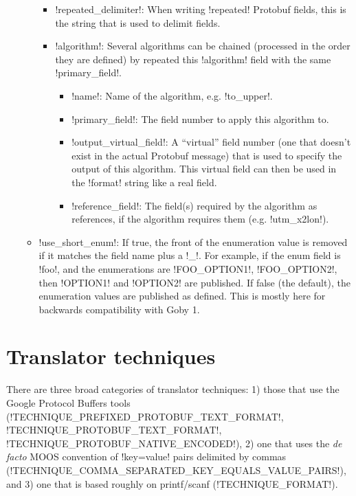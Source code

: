 \begin{itemize}
\begin{itemize}
\begin{itemize}
\item !repeated_delimiter!: When writing !repeated! Protobuf fields, this is the string that is used to delimit fields. 
\item !algorithm!: Several algorithms can be chained (processed in the order they are defined) by repeated this !algorithm! field with the same !primary_field!.
\begin{itemize}
\item !name!: Name of the algorithm, e.g. !to_upper!.
\item !primary_field!: The field number to apply this algorithm to. 
\item !output_virtual_field!: A ``virtual'' field number (one that doesn't exist in the actual Protobuf message) that is used to specify the output of this algorithm. This virtual field can then be used in the !format! string like a real field. 
\item !reference_field!: The field(s) required by the algorithm as references, if the algorithm requires them (e.g. !utm_x2lon!).
\end{itemize}
\end{itemize}
\item !use_short_enum!: If true, the front of the enumeration value is removed if it matches the field name plus a !_!. For example, if the enum field is !foo!, and the enumerations are !FOO_OPTION1!, !FOO_OPTION2!, then !OPTION1! and !OPTION2! are published. If false (the default), the enumeration values are published as defined. This is mostly here for backwards compatibility with Goby 1.
\end{itemize}
\end{itemize}


\section{Translator techniques}
\label{sec:ptranslator_techniques} 

There are three broad categories of translator techniques: 1) those that use the Google Protocol Buffers tools (!TECHNIQUE_PREFIXED_PROTOBUF_TEXT_FORMAT!, \\ !TECHNIQUE_PROTOBUF_TEXT_FORMAT!, !TECHNIQUE_PROTOBUF_NATIVE_ENCODED!), 2) one that uses the \textit{de facto} MOOS convention of !key=value! pairs delimited by commas \\(!TECHNIQUE_COMMA_SEPARATED_KEY_EQUALS_VALUE_PAIRS!), and 3) one that is based roughly on printf/scanf (!TECHNIQUE_FORMAT!).

